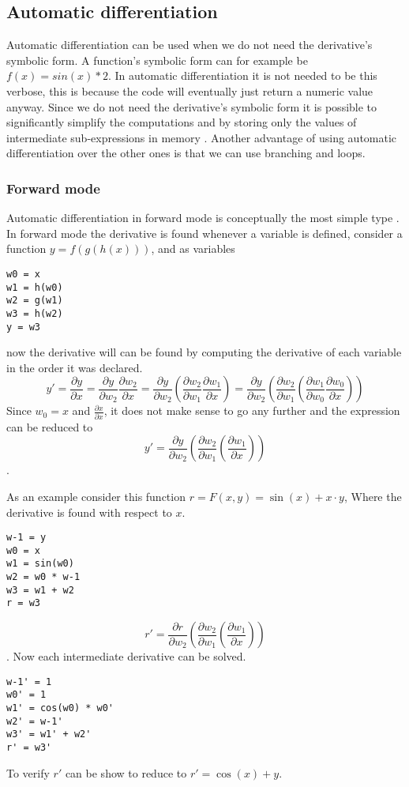 \subsection{Automatic differentiation}%
\label{sub:autodiff}

Automatic differentiation can be used when we do not need the derivative's symbolic form.
A function's symbolic form can for example be $f(x) = sin(x) * 2$.
In automatic differentiation it is not needed to be this verbose, this is because the code will eventually just return a numeric value anyway.
Since we do not need the derivative's symbolic form it is possible to significantly simplify the computations and by storing only the values of intermediate sub-expressions in memory \cite{autodiff}. Another advantage of using automatic differentiation over the other ones is that we can use branching and loops.

\subsubsection{Forward mode}

Automatic differentiation in forward mode is conceptually the most simple type \cite{autodiff}. In forward mode the derivative is found whenever a variable is defined, consider a function
$y = f(g(h(x)))$, and as variables
\begin{lstlisting}
w0 = x
w1 = h(w0)
w2 = g(w1)
w3 = h(w2)
y = w3
\end{lstlisting}
now the derivative will can be found by computing the derivative of each variable in the order it was declared.
$$y' = \frac{\partial y}{\partial x} = \frac{\partial y}{\partial w_2} \frac{\partial w_2}{\partial x} = \frac{\partial y}{\partial w_2} \left(\frac{\partial w_2}{\partial w_1} \frac{\partial w_1}{\partial x}\right) = \frac{\partial y}{\partial w_2} \left(\frac{\partial w_2}{\partial w_1} \left(\frac{\partial w_1}{\partial w_0} \frac{\partial w_0}{\partial x}\right) \right)$$
Since $w_0 = x$ and $\frac{\partial x}{\partial x}$, it does not make sense to go any further and the expression can be reduced to
$$y' = \frac{\partial y}{\partial w_2} \left(\frac{\partial w_2}{\partial w_1} \left(\frac{\partial w_1}{\partial x}\right) \right)$$.

As an example consider this function $r = F(x, y) = \sin(x) + x\cdot y$, Where the derivative is found with respect to $x$.
\begin{lstlisting}[label={lst:autodiff_fwd_trace}, caption={Forward trace of a simple function $f(x, y) = \sin(x) + x\cdot y$}]
w-1 = y
w0 = x
w1 = sin(w0)
w2 = w0 * w-1
w3 = w1 + w2
r = w3
\end{lstlisting}
$$r' = \frac{\partial r}{\partial w_2} \left(\frac{\partial w_2}{\partial w_1} \left(\frac{\partial w_1}{\partial x}\right) \right)$$.
Now each intermediate derivative can be solved.
\begin{lstlisting}[label={lst:autodiff_fwd_deriv}, caption={Forward derivative trace of a simple function $f(x, y) = \sin(x) + x\cdot y$}]
w-1' = 1
w0' = 1
w1' = cos(w0) * w0'
w2' = w-1'
w3' = w1' + w2'
r' = w3'
\end{lstlisting}
To verify $r'$ can be show to reduce to $r' = \cos(x) + y$.

